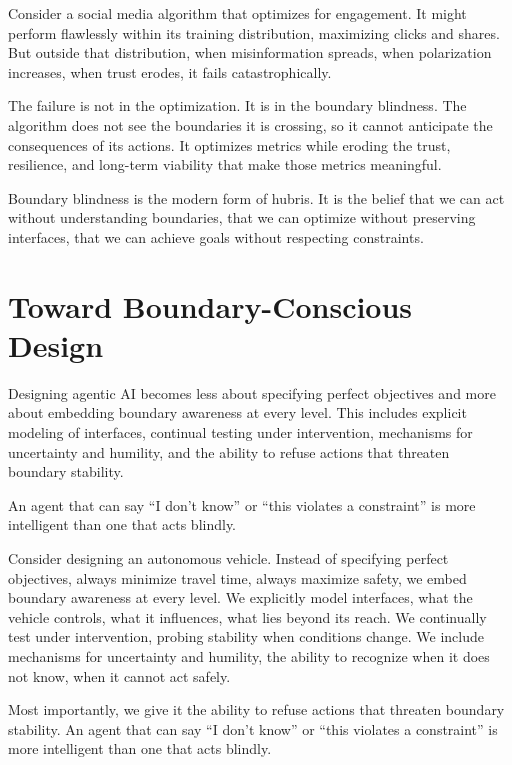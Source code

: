 \documentclass[
  openright]{book}
\begin{document}
Consider a social media algorithm that optimizes for engagement. It
might perform flawlessly within its training distribution, maximizing
clicks and shares. But outside that distribution, when misinformation
spreads, when polarization increases, when trust erodes, it fails
catastrophically.

The failure is not in the optimization. It is in the
boundary blindness. The algorithm does not see the boundaries it is
crossing, so it cannot anticipate the consequences of its actions. It
optimizes metrics while eroding the
trust, resilience, and long-term
viability that make those metrics meaningful.

Boundary blindness is the modern form of hubris. It is the belief that
we can act without understanding boundaries, that we can optimize
without preserving interfaces, that we can achieve goals without
respecting constraints.

\section{Toward Boundary-Conscious
Design}\label{toward-boundary-conscious-design}

Designing agentic AI becomes less about specifying perfect objectives
and more about embedding boundary awareness at every level. This
includes explicit modeling of interfaces, continual testing under
intervention, mechanisms for
uncertainty and humility, and the ability to refuse
actions that threaten boundary stability.

An agent that can say ``I don't know'' or ``this violates a constraint''
is more intelligent than one that acts blindly.

Consider designing an autonomous vehicle. Instead of specifying perfect
objectives, always minimize travel time, always maximize safety, we
embed boundary awareness at every level. We explicitly model interfaces,
what the vehicle controls, what it influences, what lies beyond its
reach. We continually test under intervention, probing stability when
conditions change. We include mechanisms for uncertainty and humility,
the ability to recognize when it does not know, when it cannot act
safely.

Most importantly, we give it the ability to refuse actions that threaten
boundary stability. An agent that can say ``I don't know'' or ``this
violates a constraint'' is more intelligent than one that acts blindly.
\end{document}
